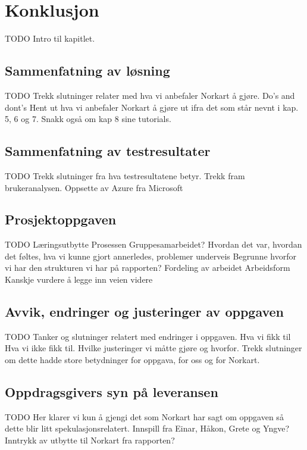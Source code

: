 \chapter{Konklusjon}
\label{chap:konklusjon}
{\color{red}TODO}
Intro til kapitlet. 

\section{Sammenfatning av løsning}
\label{sec:konklusjon_sammefatningAvLosning}
{\color{red}TODO}
Trekk slutninger relater med hva vi anbefaler Norkart å gjøre.
Do's and dont's
Hent ut hva vi anbefaler Norkart å gjøre ut ifra det som står nevnt i kap. 5, 6 og 7. Snakk også om kap 8 sine tutorials.

\section{Sammenfatning av testresultater}
\label{sec:konklusjon_sammenfatningAvTestresultater}
{\color{red}TODO}
Trekk slutninger fra hva testresultatene betyr.
Trekk fram brukeranalysen.
Oppsette av Azure fra Microsoft

\section{Prosjektoppgaven}
\label{sec:konklusjon_prosjektoppgaven}
{\color{red}TODO}
Læringsutbytte
Prosessen
Gruppesamarbeidet?
Hvordan det var, hvordan det føltes, hva vi kunne gjort annerledes, problemer underveis
Begrunne hvorfor vi har den strukturen vi har på rapporten?
Fordeling av arbeidet
Arbeidsform
Kanskje vurdere å legge inn veien videre

\section{Avvik, endringer og justeringer av oppgaven}
\label{sec:konklusjon_avvikEndringOgJusteringer}
{\color{red}TODO}
Tanker og slutninger relatert med endringer i oppgaven. 
Hva vi fikk til
Hva vi ikke fikk til.
Hvilke justeringer vi måtte gjøre og hvorfor. Trekk slutninger om dette hadde store betydninger for oppgava, for oss og for Norkart.

\section{Oppdragsgivers syn på leveransen}
\label{sec:konklusjon_oppdragsgiversSynPåLeveransen}
{\color{red}TODO}
Her klarer vi kun å gjengi det som Norkart har sagt om oppgaven så dette blir litt spekulasjonsrelatert.
Innspill fra Einar, Håkon, Grete og Yngve?
Inntrykk av utbytte til Norkart fra rapporten?

